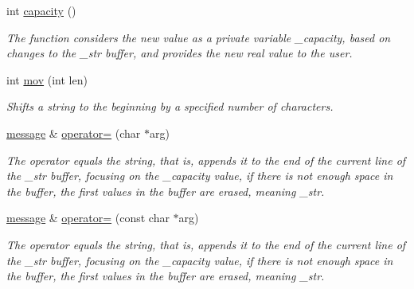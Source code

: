 \begin{DoxyCompactItemize}
int \hyperlink{classmessage_ad7becd1f37b2db660d2335aec66075c8}{capacity} ()
\begin{DoxyCompactList}\small\item\em The function considers the new value as a private variable \+\_\+capacity, based on changes to the \+\_\+str buffer, and provides the new real value to the user. \end{DoxyCompactList}\item 
int \hyperlink{classmessage_a6add30ca9731721b8b271a11c7279932}{mov} (int len)
\begin{DoxyCompactList}\small\item\em Shifts a string to the beginning by a specified number of characters. \end{DoxyCompactList}\item 
\hyperlink{classmessage}{message} \& \hyperlink{classmessage_ac31cbd97176d63baa87ee8b2fddb51aa}{operator=} (char $\ast$arg)
\begin{DoxyCompactList}\small\item\em The operator equals the string, that is, appends it to the end of the current line of the \+\_\+str buffer, focusing on the \+\_\+capacity value, if there is not enough space in the buffer, the first values in the buffer are erased, meaning \+\_\+str. \end{DoxyCompactList}\item 
\hyperlink{classmessage}{message} \& \hyperlink{classmessage_a6264b8942d815bd3d999b2a9b6475825}{operator=} (const char $\ast$arg)
\begin{DoxyCompactList}\small\item\em The operator equals the string, that is, appends it to the end of the current line of the \+\_\+str buffer, focusing on the \+\_\+capacity value, if there is not enough space in the buffer, the first values in the buffer are erased, meaning \+\_\+str. \end{DoxyCompactList}\end{DoxyCompactItemize}
